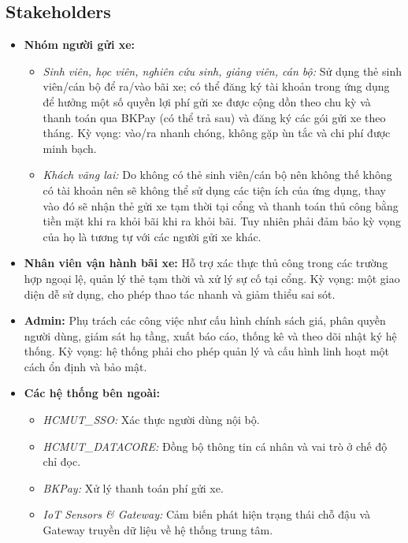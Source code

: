 \documentclass[a4paper,12pt]{article}
\begin{document}
\subsection{Stakeholders}
\begin{itemize}
    \item \textbf{Nhóm người gửi xe:}
    \begin{itemize}
        \item \textit{Sinh viên, học viên, nghiên cứu sinh, giảng viên, cán bộ:} Sử dụng thẻ sinh viên/cán bộ để ra/vào bãi xe; có thể đăng ký tài khoản trong ứng dụng để hưởng một số quyền lợi phí gửi xe được cộng dồn theo chu kỳ và thanh toán qua BKPay (có thể trả sau) và đăng ký các gói gửi xe theo tháng. Kỳ vọng: vào/ra nhanh chóng, không gặp ùn tắc và chi phí được minh bạch.

        \item \textit{Khách vãng lai:} Do không có thẻ sinh viên/cán bộ nên không thế không có tài khoản nên sẽ không thể sử dụng các tiện ích của ứng dụng, thay vào đó sẽ nhận thẻ gửi xe tạm thời tại cổng và thanh toán thủ công bằng tiền mặt khi ra khỏi bãi khi ra khỏi bãi. Tuy nhiên phải đảm bảo kỳ vọng của họ là tương tự với các người gửi xe khác.
    \end{itemize}

    \item \textbf{Nhân viên vận hành bãi xe:} 
    Hỗ trợ xác thực thủ công trong các trường hợp ngoại lệ, quản lý thẻ tạm thời và xử lý sự cố tại cổng. Kỳ vọng: một giao diện dễ sử dụng, cho phép thao tác nhanh và giảm thiểu sai sót.

    \item \textbf{Admin:} 
    Phụ trách các công việc như cấu hình chính sách giá, phân quyền người dùng, giám sát hạ tầng, xuất báo cáo, thống kê và theo dõi nhật ký hệ thống. Kỳ vọng: hệ thống phải cho phép quản lý và cấu hình linh hoạt một cách ổn định và bảo mật.

    \item \textbf{Các hệ thống bên ngoài:}
    \begin{itemize}
        \item \textit{HCMUT\_SSO:} Xác thực người dùng nội bộ.
        \item \textit{HCMUT\_DATACORE:} Đồng bộ thông tin cá nhân và vai trò ở chế độ chỉ đọc.
        \item \textit{BKPay:} Xử lý thanh toán phí gửi xe.
        \item \textit{IoT Sensors \& Gateway:} Cảm biến phát hiện trạng thái chỗ đậu và Gateway truyền dữ liệu về hệ thống trung tâm.
    \end{itemize}
\end{itemize}
\end{document}
